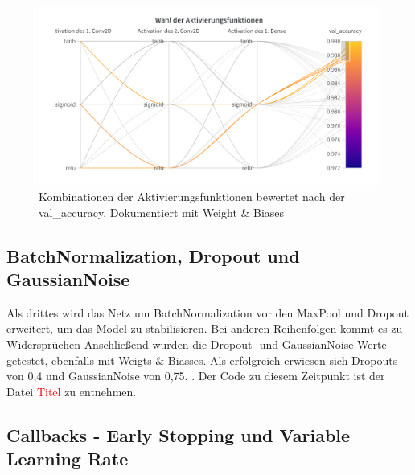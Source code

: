 \documentclass[
fontsize=12pt,					%
paper=a4,						%
twoside=false, 					%
listof=totoc, 					%
bibliography=totoc,				%
titlepage, 						%
headsepline, 					%
DIV=12,							%
BCOR=6mm,						%
cleardoublepage=empty,			%
parskip,							%
ngerman
]{scrartcl}
\begin{document}
\begin{figure}[h]
	\centering
	\includegraphics[width=0.7\linewidth]{images/Activ}
	\caption{Kombinationen der Aktivierungsfunktionen bewertet nach der val\_accuracy. Dokumentiert mit Weight \& Biases}
	\label{fig:activ}
\end{figure}

\subsection{BatchNormalization, Dropout und GaussianNoise}

Als drittes wird das Netz um BatchNormalization vor den MaxPool und Dropout erweitert, um das Model zu stabilisieren. Bei anderen Reihenfolgen kommt es zu Widersprüchen \autocite{Li.2018} Anschließend wurden die Dropout- und GaussianNoise-Werte getestet, ebenfalls mit Weigts \& Biasses. Als erfolgreich erwiesen sich Dropouts von 0,4 und GaussianNoise von 0,75. \autocite{Cai.2020}. Der Code zu diesem Zeitpunkt ist der Datei \textcolor{red}{Titel} zu entnehmen.

%	
%	
%	
%	
%	
%	
%	

\subsection{Callbacks - Early Stopping und Variable Learning Rate}
\end{document}

